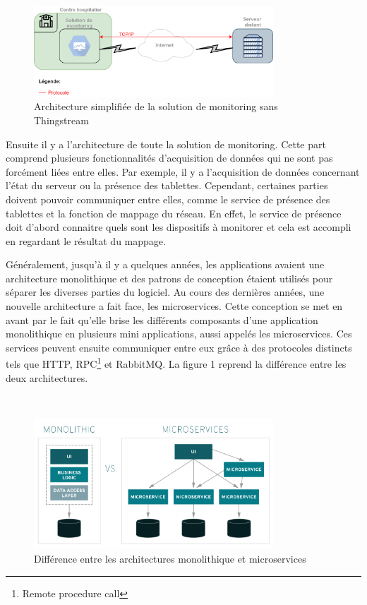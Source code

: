 ~

\begin{figure}[ht!]
  \centering
  \includegraphics[width=0.8\textwidth ]{img/app/arch_no_thingstream.png}
  \caption{Architecture simplifiée de la solution de monitoring sans Thingstream}
  \label{fig:start_no_thing}
\end{figure}

\noindent
Ensuite il y a l'architecture de toute la solution de monitoring. Cette part comprend plusieurs fonctionnalités d'acquisition de données qui ne sont pas forcément liées entre elles. Par exemple, il y a l'acquisition de données concernant l'état du serveur ou la présence des tablettes. Cependant, certaines parties doivent pouvoir communiquer entre elles, comme le service de présence des tablettes et la fonction de mappage du réseau. En effet, le service de présence doit d'abord connaitre quels sont les dispositifs à monitorer et cela est accompli en regardant le résultat du mappage.


\noindent
Généralement, jusqu'à il y a quelques années, les applications avaient une architecture monolithique et des patrons de conception étaient utilisés pour séparer les diverses parties du logiciel. Au cours des dernières années, une nouvelle architecture a fait face, les microservices.  Cette conception se met en avant par le fait qu'elle brise les différents composants d'une application monolithique en plusieurs mini applications, aussi appelés les microservices. Ces services peuvent ensuite communiquer entre eux grâce à des protocoles distincts tels que HTTP, RPC\footnote{Remote procedure call} et RabbitMQ. La figure 1 reprend la différence entre les deux architectures.

~

\begin{figure}[ht!]
  \centering
  \includegraphics[width=0.8\textwidth]{img/app/monolithic-vs-microservices.png}
  \caption{Différence entre les architectures monolithique et microservices \cite{micro_diff}}
  \label{fig:monvsmicro}
\end{figure}

